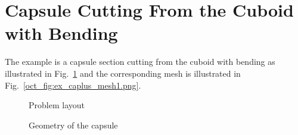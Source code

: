\section{Capsule Cutting From the Cuboid with Bending}
The example is a capsule section cutting from the cuboid with bending as illustrated in Fig.~\ref{oct_fig:ex_caplus_layout} and the corresponding mesh is illustrated in Fig.~\ref{oct_fig:ex_caplus_mesh1.png}.
\begin{figure}[h!]
  \centering
  \caption{Problem layout}
  \label{oct_fig:ex_caplus_layout}
\end{figure}

\begin{figure}[h!]
  \centering
  \caption{Geometry of the capsule}
  \label{oct_fig:ex_caplus_geo}
\end{figure}


